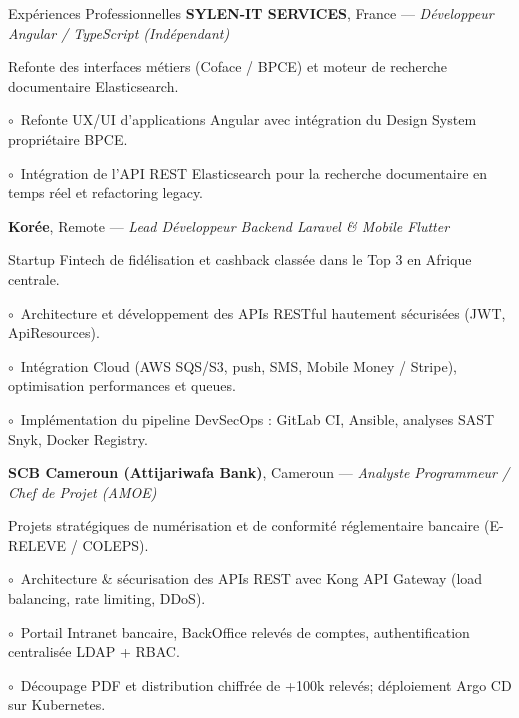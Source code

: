 \begin{rubric}{Expériences Professionnelles}
%
	\textbf{SYLEN-IT SERVICES}, France --- \emph{Développeur Angular / TypeScript (Indépendant)}\par
	Refonte des interfaces métiers (Coface / BPCE) et moteur de recherche documentaire Elasticsearch.
	\par\hspace{1em}$\circ$~Refonte UX/UI d'applications Angular avec intégration du Design System propriétaire BPCE.
	\par\hspace{1em}$\circ$~Intégration de l'API REST Elasticsearch pour la recherche documentaire en temps réel et refactoring legacy.

%
	\textbf{Korée}, Remote --- \emph{Lead Développeur Backend Laravel \& Mobile Flutter}\par
	Startup Fintech de fidélisation et cashback classée dans le Top 3 en Afrique centrale.
	\par\hspace{1em}$\circ$~Architecture et développement des APIs RESTful hautement sécurisées (JWT, ApiResources).
	\par\hspace{1em}$\circ$~Intégration Cloud (AWS SQS/S3, push, SMS, Mobile Money / Stripe), optimisation performances et queues.
	\par\hspace{1em}$\circ$~Implémentation du pipeline DevSecOps : GitLab CI, Ansible, analyses SAST Snyk, Docker Registry.

%
	\textbf{SCB Cameroun (Attijariwafa Bank)}, Cameroun --- \emph{Analyste Programmeur / Chef de Projet (AMOE)}\par
	Projets stratégiques de numérisation et de conformité réglementaire bancaire (E-RELEVE / COLEPS).
	\par\hspace{1em}$\circ$~Architecture \& sécurisation des APIs REST avec Kong API Gateway (load balancing, rate limiting, DDoS).
	\par\hspace{1em}$\circ$~Portail Intranet bancaire, BackOffice relevés de comptes, authentification centralisée LDAP + RBAC.
	\par\hspace{1em}$\circ$~Découpage PDF et distribution chiffrée de +100k relevés; déploiement Argo CD sur Kubernetes.


\end{rubric}
